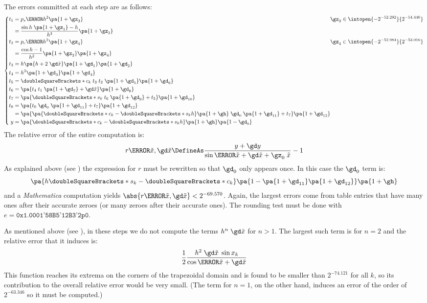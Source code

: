 \documentclass[10pt, a4paper, twoside]{basestyle}
\newcommand{\round}[1]{\doubleSquareBrackets*{#1}}
\newcommand{\red}[1]{\tilde{#1}}
\begin{document}
The errors committed at each step are as follows:
\[
\left\{
\begin{alignedat}{2}
t_1 &= p_s\of{h^2} \pa{1 + \gz_3} \qquad & \gz_3 \in \intopen{-2^{-52.292}}{2^{-54.446}} \\
&= \frac{\sin h \; \pa{1 + \gz_1} - h}{h^3} \pa{1 + \gz_3} \\
t_2 &= p_c\of{h^2} \pa{1 + \gz_4} \qquad & \gz_4 \in \intopen{-2^{-52.984}}{2^{-53.016}} \\
&= \frac{\cos h - 1}{h^2} \pa{1 + \gz_2} \pa{1 + \gz_4} \\
t_3 &= h \pa{h + 2 \; \gd \red x} \pa{1 + \gd_1} \pa{1 + \gd_2} \\
t_4 &= h^3 \pa{1 + \gd_3} \pa{1 + \gd_4} \\
t_5 &= \round{c_k} \; t_3 \; t_2 \; \pa{1 + \gd_5} \pa{1 + \gd_6} \\
t_6 &= \pa{t_4 \; t_1 \; \pa{1 + \gd_7} + \gd \red x} \pa{1 + \gd_8} \\
t_7 &= \pa{\round{s_k} \; t_6 \; \pa{1 + \gd_9} + t_5} \pa{1 + \gd_{10}} \\
t_8 &= \pa{t_0 \; \gd_0 \; \pa{1 + \gd_{11}} + t_7} \pa{1 + \gd_{12}} \\
&= \pa{\pa{\round{c_k} - \round{s_k} h} \pa{1 + \gh} \; \gd_0 \; \pa{1 + \gd_{11}} + t_7} \pa{1 + \gd_{12}} \\
y &= \pa{\round{c_k} - \round{s_k} h} \pa{1 + \gh} \pa{1 - \gd_0}
\end{alignedat}
\right.
\]
The relative error of the entire computation is:
\[
r\of{\red x, \gd \red x} \DefineAs \frac{y + \gd y}{\sin\of{\red x + \gd \red x + \gz_0 \; \red x}} - 1
\]
As explained above (see ) the expression for $r$ must be rewritten so that $\gd_0$ only appears once.  In this case the $\gd_0$ term is:
\[
\pa{h \round{s_k} - \round{c_k}} \pa{1 - \pa{1 + \gd_{11}} \pa{1 + \gd_{12}}} \pa{1 + \gh}
\]
and a \textit{Mathematica} computation yields $\abs{r\of{\red x, \gd \red x}} < 2^{-69.570}$.  Again, the largest errors come from table entries that have many ones after their accurate zeroes (or many zeroes after their accurate ones).  The rounding test must be done with $e = \texttt{0x1.0001'58B5'12B3'2p0}$.

As mentioned above (see ), in these steps we do not compute the terms $h^n \; \gd \red x$ for $n > 1$.  The largest such term is for $n = 2$ and the relative error that it induces is:
\[
\frac{1}{2}\frac{h^2 \; \gd \red x \; \sin x_k}{\cos\of{\red x + \gd \red x}}
\]
This function reaches its extrema on the corners of the trapezoidal domain and is found to be smaller than $2^{-74.121}$ for all $k$, so its contribution to the overall relative error would be very small.  (The term for $n = 1$, on the other hand, induces an error of the order of $2^{-63.346}$ so it must be computed.)
\end{document}
